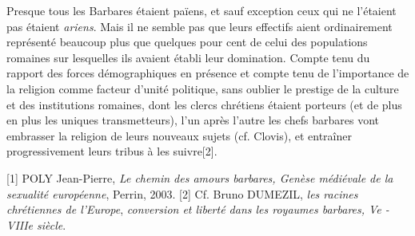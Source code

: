  Presque tous les Barbares étaient païens, et sauf exception ceux qui ne l'étaient pas étaient \emph{ariens}. Mais il ne semble pas que leurs effectifs aient ordinairement représenté beaucoup plus que quelques pour cent de celui des populations romaines sur lesquelles ils avaient établi leur domination. Compte tenu du rapport des forces démographiques en présence et compte tenu de l'importance de la religion comme facteur d'unité politique, sans oublier le prestige de la culture et des institutions romaines, dont les clercs chrétiens étaient porteurs (et de plus en plus les uniques transmetteurs), l'un après l'autre les chefs barbares vont embrasser la religion de leurs nouveaux sujets (cf. Clovis), et entraîner progressivement leurs tribus à les suivre[2]. 
 
[1] POLY Jean-Pierre, \emph{Le chemin des amours barbares, Genèse médiévale de la sexualité européenne}, Perrin, 2003. 
[2] Cf. Bruno DUMEZIL, \emph{les racines chrétiennes de l'Europe}, \emph{conversion et liberté dans les royaumes barbares, Ve - VIIIe siècle}.